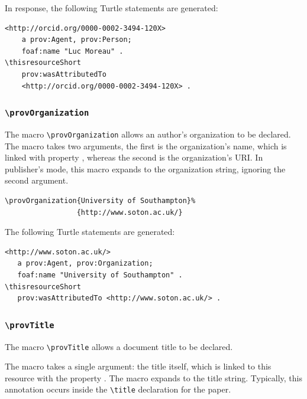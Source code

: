 \documentclass{sigplanconf}
\newcommand{\provstyMacro}[1]{{\tt \textbackslash prov{#1}}\xspace}
\newcommand{\latexMacro}[1]{{\tt \textbackslash#1}\xspace}
\begin{document}
\noindent In response, the following Turtle statements are generated:

{\footnotesize
\begin{Verbatim}[commandchars=\\\{\}]
<http://orcid.org/0000-0002-3494-120X>
    a prov:Agent, prov:Person;
    foaf:name "Luc Moreau" . 
\thisresourceShort
    prov:wasAttributedTo 
    <http://orcid.org/0000-0002-3494-120X> .
\end{Verbatim}
}


\subsubsection{\provstyMacro{Organization}}\label{organization:macro}

The macro \provstyMacro{Organization} allows an author's organization
to be declared.
The macro takes two arguments, the first is the organization's name,
which is linked with property , whereas the second is the
organization's URI.  In publisher's mode, this macro expands to the
organization string, ignoring the second argument.

{\footnotesize
\begin{Verbatim}
\provOrganization{University of Southampton}%
                 {http://www.soton.ac.uk/}
\end{Verbatim}
}

\noindent The following Turtle statements are generated:

{\footnotesize
\begin{Verbatim}[commandchars=\\\{\}]
<http://www.soton.ac.uk/>
   a prov:Agent, prov:Organization;
   foaf:name "University of Southampton" . 
\thisresourceShort
   prov:wasAttributedTo <http://www.soton.ac.uk/> .
\end{Verbatim}
}
  

\subsubsection{\provstyMacro{Title}}

The macro \provstyMacro{Title} allows a document title to be declared.

The macro takes a single argument: the title itself, which 
 is linked to this resource with the property .
The macro expands to the title
string. Typically, this annotation
occurs inside the \latexMacro{title} declaration for the paper.
\end{document}
